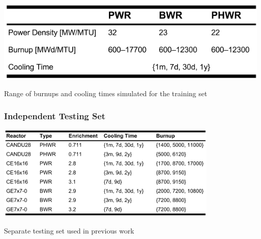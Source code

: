 \begin{frame}
\begin{minipage}{0.5\textwidth}
  \end{minipage}%
  \begin{minipage}{0.5\textwidth}
    \begin{table}
      \centering
      \includegraphics[width=\linewidth]{./figures/TrainData2.png}
      \caption{Range of burnups and cooling times simulated for the training set \cite{dayman_feasibility_2013}}
    \end{table}
  \end{minipage}
\end{frame}

\begin{frame}
  \frametitle{Independent Testing Set}
  \begin{table}
    \centering
    \includegraphics[width=0.8\textwidth]{./figures/TestData.png}
    \caption{Separate testing set used in previous work \cite{dayman_feasibility_2013}}
  \end{table} 
\end{frame}
